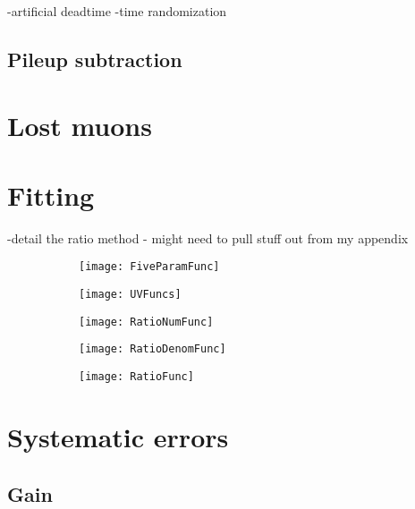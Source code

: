 -artificial deadtime
-time randomization

\subsection{Pileup subtraction}
\label{sub:pileupsubtraction}


\section{Lost muons}
\label{sec:lostmuons}




\section{Fitting}
\label{sec:Fitting}


-detail the ratio method - might need to pull stuff out from my appendix


    \begin{figure}[]
    \centering
        \begin{subfigure}[t]{0.45\textwidth}
            \centering
            \texttt{[image: FiveParamFunc]}
            \caption{}
        \end{subfigure}%

        \vspace{2mm}
        \begin{subfigure}[t]{0.45\textwidth}
            \centering
            \texttt{[image: UVFuncs]}
            \caption{}
        \end{subfigure}
        \begin{subfigure}[t]{0.45\textwidth}
            \centering
            \texttt{[image: RatioNumFunc]}
            \caption{}
        \end{subfigure}%
        \vspace{2mm}
        \begin{subfigure}[t]{0.45\textwidth}
            \centering
            \texttt{[image: RatioDenomFunc]}
            \caption{}
        \end{subfigure}
        \begin{subfigure}[t]{0.45\textwidth}
            \centering
            \texttt{[image: RatioFunc]}
            \caption{}
        \end{subfigure}%
    \caption[]{}
    \label{}
    \end{figure}






\section{Systematic errors}
\label{sec:Systematic Errors}



\subsection{Gain}
\label{sub:gain}



\cleardoublepage
